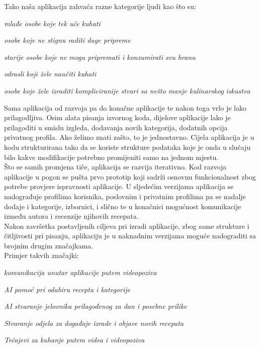 		\noindent Tako naša aplikacija zahvaća razne kategorije ljudi kao što su:
		\begin{packed_item}
			\item \textit{mlađe osobe koje tek uče kuhati}
			\item \textit{osobe koje ne stignu raditi duge pripreme}
			\item \textit{starije osobe koje ne mogu pripremati i konzumirati svu hranu}
			\item \textit{odrasli koji žele naučiti kuhati}
			\item \textit{osobe koje žele izraditi kompliciranije stvari sa nešto manje kulinarskog iskustva}
		\end{packed_item}
		
		\noindent Sama aplikacija od razvoja pa do konačne aplikacije te nakon toga vrlo je lako prilagodljiva. Osim alata pisanja izvornog koda, dijelove aplikacije lako je prilagoditi u smislu izgleda, dodavanja novih kategorija, dodatnih opcija privatnog profila. Ako želimo znati zašto, to je jednostavno. Cijela aplikacija je u kodu strukturirana tako da se koriste strukture podataka koje je onda u slučaju bilo kakve modifikacije potrebno promijeniti samo na jednom mjestu.\\
		
		\noindent Što se samih promjena tiče, aplikacija se razvija iterativno. Kod razvoja aplikacije u pogon se pušta prvo prototip koji sadrži osnovnu funkcionalnost zbog potrebe provjere ispravnosti aplikacije. U sljedećim verzijama aplikacija se nadograđuje profilima korisnika, poslovnim i privatnim profilima pa se nadalje dodaje i kategorije, izbornici, i slično te u konačnici mogućnost komunikacije između autora i recenzije njihovih recepata. \\
		
		\noindent Nakon završetka postavljenih ciljeva pri izradi aplikacije, zbog same strukture i čitljivosti pri pisanju, aplikaciju je u naknadnim verzijama moguće nadograditi sa brojnim drugim značajkama.\\
		Primjer takvih značajki:
		
		\begin{packed_item}
			\item \textit{komunikacija unutar aplikacije putem videopoziva}
			\item \textit{AI pomoć pri odabiru recepta i kategorije}
			\item \textit{AI stvaranje jelovnika prilagođenog za dan i posebne prilike}
			\item \textit{Stvaranje odjela za događaje izrade i objave novih recepata}
			\item \textit{Tečajevi za kuhanje putem videa i videopoziva}
		\end{packed_item}
		
	
		
		
		
		\eject
		
	